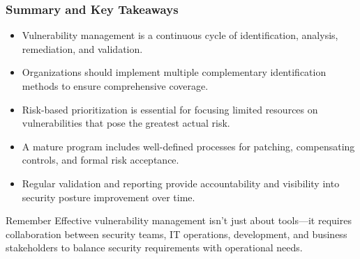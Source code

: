 \documentclass{beamer}
\begin{document}
        \begin{frame}
        \frametitle{Summary and Key Takeaways}
        \begin{itemize}
            \item Vulnerability management is a continuous cycle of identification, analysis, remediation, and validation.
            \item Organizations should implement multiple complementary identification methods to ensure comprehensive coverage.
            \item Risk-based prioritization is essential for focusing limited resources on vulnerabilities that pose the greatest actual risk.
            \item A mature program includes well-defined processes for patching, compensating controls, and formal risk acceptance.
            \item Regular validation and reporting provide accountability and visibility into security posture improvement over time.
        \end{itemize}
        
        \begin{alertblock}{Remember}
            \scriptsize
        Effective vulnerability management isn't just about tools—it requires collaboration between security teams, IT operations, development, and business stakeholders to balance security requirements with operational needs.
        \end{alertblock}
        \end{frame}
        
        
        
        
\end{document}
